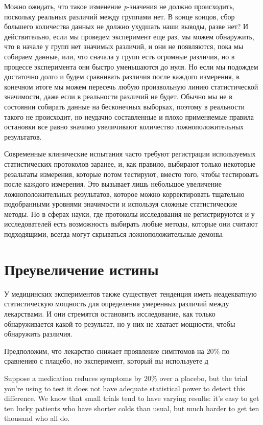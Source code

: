 Можно ожидать, что такое изменение \emph{p}-значения не должно происходить, поскольку реальных различий между группами нет. В конце концов, сбор большего количества данных не должно ухудшать наши выводы, разве нет? И действительно, если мы проведем эксперимент еще раз, мы можем обнаружить, что в начале у групп нет значимых различий, и они не появляются, пока мы собираем данные, или, что сначала у групп есть огромные различия, но в процессе эксперимента они быстро уменьшаются до нуля. Но если мы подождем достаточно долго и будем сравнивать различия после каждого измерения, в конечном итоге мы можем пересечь любую произвольную линию статистической значимости, даже если в реальности различий не будет. Обычно мы не в состоянии собирать данные на бесконечных выборках, поэтому в реальности такого не происходит, но неудачно  составленные и плохо применяемые правила остановки все равно значимо увеличивают количество ложноположительных результатов. \cite{simmons_false-positive_2011}  


Современные клинические испытания часто требуют регистрации используемых статистических протоколов заранее, и, как правило, выбирают только некоторые резальтаты измерения, которые потом тестируют, вместо того, чтобы тестировать после каждого измерения. Это вызывает лишь небольшое увеличение ложноположительных результатов, которое можно корректировать тщательно подобранными уровнями значимости и используя сложные статистические методы.\cite{todd_interim_2001} Но в сферах науки, где протоколы исследования не регистрируются и у исследователей есть возможность выбирать любые методы, которые они считают подходящими, всегда могут скрываться ложноположительные демоны.


\section{Преувеличение истины}
\label{chp7:truthinflation}

У медицинских экспериментов также существует тенденция иметь неадекватную статистическую мощность для определения умеренных различий между лекарствами. И они стремятся остановить исследование, как только обнаруживается какой-то результат, но у них не хватает мощности, чтобы обнаружить различия.

Предположим, что лекарство снижает проявление симптомов на 20\% по сравнению с плацебо, но эксперимент, который вы используете д

Suppose a medication reduces symptoms by 20\% over a placebo, but the trial you’re using to test it does not have adequate statistical power to detect this difference. We know that small trials tend to have varying results: it’s easy to get ten lucky patients who have shorter colds than usual, but much harder to get ten thousand who all do.

